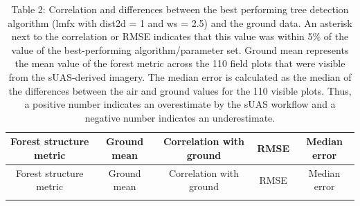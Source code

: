 \documentclass[]{article}
\begin{document}
\begin{longtable}[]{@{}ccccc@{}}
\caption{Table 2: Correlation and differences between the best
performing tree detection algorithm (lmfx with dist2d = 1 and ws = 2.5)
and the ground data. An asterisk next to the correlation or RMSE
indicates that this value was within 5\% of the value of the
best-performing algorithm/parameter set. Ground mean represents the mean
value of the forest metric across the 110 field plots that were visible
from the sUAS-derived imagery. The median error is calculated as the
median of the differences between the air and ground values for the 110
visible plots. Thus, a positive number indicates an overestimate by the
sUAS workflow and a negative number indicates an
underestimate.}\tabularnewline
\toprule
\begin{minipage}[b]{0.28\columnwidth}\centering
Forest structure metric\strut
\end{minipage} & \begin{minipage}[b]{0.13\columnwidth}\centering
Ground mean\strut
\end{minipage} & \begin{minipage}[b]{0.24\columnwidth}\centering
Correlation with ground\strut
\end{minipage} & \begin{minipage}[b]{0.08\columnwidth}\centering
RMSE\strut
\end{minipage} & \begin{minipage}[b]{0.14\columnwidth}\centering
Median error\strut
\end{minipage}\tabularnewline
\midrule
\endfirsthead
\toprule
\begin{minipage}[b]{0.28\columnwidth}\centering
Forest structure metric\strut
\end{minipage} & \begin{minipage}[b]{0.13\columnwidth}\centering
Ground mean\strut
\end{minipage} & \begin{minipage}[b]{0.24\columnwidth}\centering
Correlation with ground\strut
\end{minipage} & \begin{minipage}[b]{0.08\columnwidth}\centering
RMSE\strut
\end{minipage} & \begin{minipage}[b]{0.14\columnwidth}\centering
Median error\strut
\end{minipage}\tabularnewline
\midrule
\endhead
\begin{minipage}[t]{0.28\columnwidth}\centering

\end{minipage}
\end{longtable}
\end{document}
